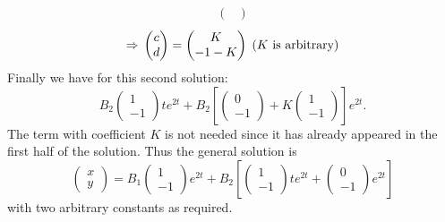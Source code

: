 \documentclass[12pt]{report}
\theoremstyle{definition}
\begin{document}
\begin{ex}
\begin{enumerate}[label = (\roman*)]
\[\begin{align*}
\begin{pmatrix}
                                \end{pmatrix}                             
                            \end{align*}
                        \]\[
                                \Rightarrow{}\begin{pmatrix}
                                        c \\
                                        d
                                \end{pmatrix} = \begin{pmatrix}
                                        K \\
                                        -1-K
                                \end{pmatrix} \;\textnormal{($K$ is arbitrary)}
                    \]
                    Finally we have for this second solution:\[
                        B_2 \begin{pmatrix}
                                1 \\
                                -1
                        \end{pmatrix} t e^{2t} + B_2 \left[\begin{pmatrix}
                                0 \\
                                -1
                        \end{pmatrix} + K\begin{pmatrix}
                                1 \\
                                -1
                        \end{pmatrix} \right] e^{2t}.
                    \]The term with coefficient $K$ is not needed since
                    it has already appeared in the first half of the solution.
                    Thus the general solution is\[
                        \begin{pmatrix}
                                x \\
                                y
                        \end{pmatrix} = B_1\begin{pmatrix}
                                1 \\
                                -1
                        \end{pmatrix} e^{2t} + B_{2} \left[\begin{pmatrix}
                                1 \\
                                -1
                        \end{pmatrix} t e^{2t} + \begin{pmatrix}
                                0 \\
                                -1
                        \end{pmatrix} e^{2t}\right] 
                    \]with two arbitrary constants as required.
            

\end{enumerate}
\end{ex}
\end{document}

